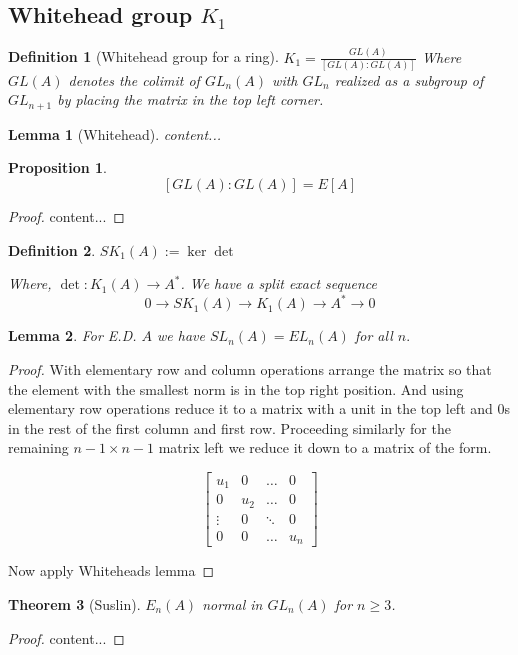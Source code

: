 \documentclass[12pt]{article}
\numberwithin{equation}{section}
\newtheorem{theorem}{Theorem}[section]
\newtheorem{definition}{Definition}[section]
\newtheorem{lemma}[theorem]{Lemma}
\newtheorem{proposition}{Proposition}[section]
\begin{document}
	\subsection{Whitehead group $K_1$}
	\begin{definition}[Whitehead group for a ring]
		$K_1= \frac{GL(A)}{[GL(A):GL(A)]}$
		Where $GL(A)$ denotes the colimit of $GL_n(A)$ with $GL_{n}$ realized as a subgroup of $GL_{n+1}$ by placing the matrix in the top left corner. 
	\end{definition}
	
	\begin{lemma}[Whitehead]
		content...
	\end{lemma}
	\begin{proposition}
		\[ [GL(A):GL(A)]=E[A] \]
	\end{proposition}
	\begin{proof}
		content...
	\end{proof}	
	
	\begin{definition}
		$SK_1(A):= \ker \det$
		
		Where, $\det : K_1(A) \to A^*$. We have a split exact sequence
		\[ 0 \to SK_1(A) \to K_1(A) \to A^* \to 0 \]
	\end{definition}
	
	
	\begin{lemma}
		For E.D. $A$ we have $SL_n(A)=EL_n(A)$ for all $n.$
	\end{lemma}
	\begin{proof}
		With elementary row and column operations arrange the matrix so that the element with the smallest norm is in the top right position. And using elementary row operations reduce it to a matrix with a unit in the top left and 0s in the rest of the first column and first row. Proceeding similarly for the remaining $n-1 \times n-1 $ matrix left we reduce it down to a matrix of the form.
		
		\[ \begin{bmatrix}
			u_1 & 0 & \dots & 0 \\
			0 & u_2 & \dots & 0 \\
			\vdots & 0 & \ddots & 0\\
			0 & 0 & \dots & u_n 
		\end{bmatrix} \]
		
	Now apply Whiteheads lemma 
	\end{proof}
	
	\begin{theorem}[Suslin]
		$E_n(A)$ normal in $GL_n(A)$ for $n \geq 3$. 
	\end{theorem}
	\begin{proof}
		content...
	\end{proof}
	
\end{document}
